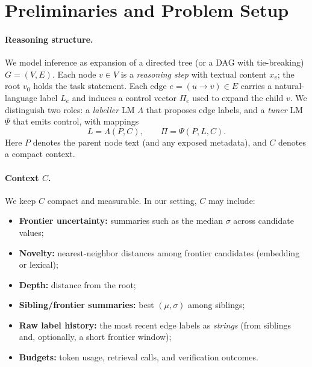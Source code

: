 \documentclass{article}
\theoremstyle{plain}
\theoremstyle{definition}
\theoremstyle{remark}
\begin{document}
\section{Preliminaries and Problem Setup}
\label{sec:prelims}

\paragraph{Reasoning structure.}
We model inference as expansion of a directed tree (or a DAG with tie-breaking) $G=(V,E)$.
Each node $v\in V$ is a \emph{reasoning step} with textual content $x_v$; the root $v_0$ holds the task statement.
Each edge $e=(u\!\rightarrow\! v)\in E$ carries a natural-language label $L_e$ and induces a control vector $\Pi_e$ used to expand the child $v$.
We distinguish two roles: a \emph{labeller} LM $\Lambda$ that proposes edge labels, and a \emph{tuner} LM $\Psi$ that emits control, with mappings
\begin{equation*}
  L=\Lambda(P,C), \qquad \Pi=\Psi(P,L,C).
\end{equation*}
Here $P$ denotes the parent node text (and any exposed metadata), and $C$ denotes a compact context.

\paragraph{Context $C$.}
We keep $C$ compact and measurable. In our setting, $C$ may include:
\begin{itemize}
  \item \textbf{Frontier uncertainty:} summaries such as the median $\sigma$ across candidate values;
  \item \textbf{Novelty:} nearest-neighbor distances among frontier candidates (embedding or lexical);
  \item \textbf{Depth:} distance from the root;
  \item \textbf{Sibling/frontier summaries:} best $(\mu,\sigma)$ among siblings;
  \item \textbf{Raw label history:} the most recent edge labels as \emph{strings} (from siblings and, optionally, a short frontier window);
  \item \textbf{Budgets:} token usage, retrieval calls, and verification outcomes.
\end{itemize}
\end{document}
